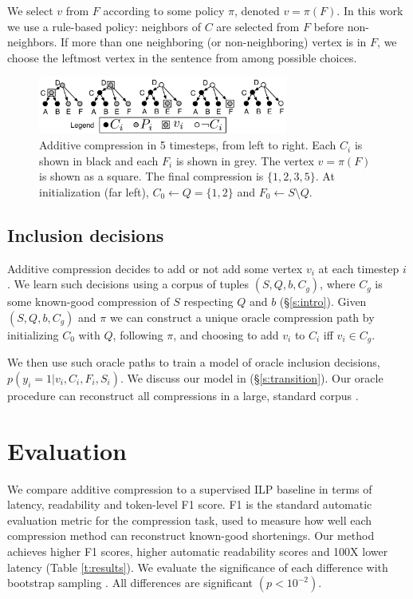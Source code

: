 \documentclass[11pt,a4paper]{article}
\begin{document}
We select $v$ from $F$ according to some policy $\pi$, denoted $v = \pi(F)$. In this work we use a rule-based policy: neighbors of $C$ are selected from $F$ before non-neighbors. If more than one neighboring (or non-neighboring) vertex is in $F$, we choose the leftmost vertex in the sentence from among possible choices.
 
\begin{figure}[h]
\includegraphics[width=8.2cm]{additive.pdf}
\caption{Additive compression in 5 timesteps, from left to right. Each $C_i$ is shown in black and each $F_i$ is shown in grey. The vertex $v= \pi(F)$ is shown as a square. The final compression is $\{1,2,3,5\}$. At initialization (far left), $C_0 \gets Q = \{1,2\}$ and $F_0 \gets S \setminus Q$.  }
\end{figure}\label{f:walkthru}


\subsection{Inclusion decisions}\label{s:modeling}

Additive compression decides to add or not add some vertex $v_i$ at each timestep $i$. We learn such decisions using a corpus of tuples $(S,Q,b,C_g)$, where $C_g$ is some known-good compression of $S$ respecting $Q$ and $b$ (\S\ref{s:intro}). Given $(S,Q,b,C_g)$ and $\pi$ we can construct a unique oracle compression path by initializing $C_0$ with $Q$, following $\pi$, and choosing to add $v_i$ to $C_i$ iff $v_i \in C_g$. 

We then use such oracle paths to train a model of oracle inclusion decisions, ${p(y_i  = 1 | v_i, C_i, F_i, S_i)}$. We discuss our model in (\S\ref{s:transition}). Our oracle procedure can reconstruct all compressions in a large, standard corpus \cite{filippova2013overcoming}. 

\section{Evaluation}\label{s:autoeval}

We compare additive compression to a supervised ILP baseline in terms of latency, readability and token-level F1 score. F1 is the standard automatic evaluation metric for the compression task, used to measure how well each compression method can reconstruct known-good shortenings. Our method achieves higher F1 scores, higher automatic readability scores and 100X lower latency (Table \ref{t:results}). We evaluate the significance of each difference with bootstrap sampling \cite{D12-1091}. All differences are significant {\small $(p < 10^{-2})$}. 
\end{document}
